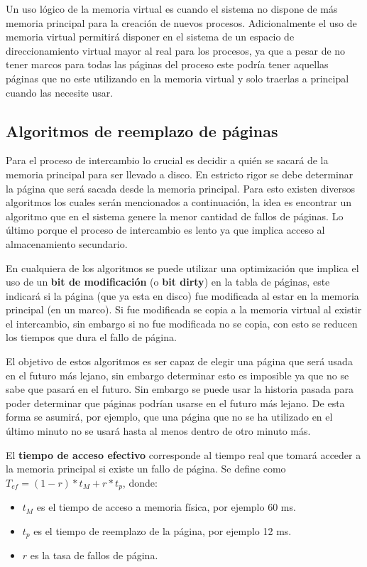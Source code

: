 Un uso lógico de la memoria virtual es cuando el sistema no dispone de más
memoria principal para la creación de nuevos procesos. Adicionalmente el uso de
memoria virtual permitirá disponer en el sistema de un espacio de
direccionamiento virtual mayor al real para los procesos, ya que a pesar de no
tener marcos para todas las páginas del proceso este podría tener aquellas
páginas que no este utilizando en la memoria virtual y solo traerlas a principal
cuando las necesite usar.

\subsection{Algoritmos de reemplazo de páginas}
Para el proceso de intercambio lo crucial es decidir a quién se sacará de la
memoria principal para ser llevado a disco. En estricto rigor se debe determinar
la página que será sacada desde la memoria principal. Para esto existen diversos
algoritmos los cuales serán mencionados a continuación, la idea es encontrar un
algoritmo que en el sistema genere la menor cantidad de fallos de páginas. Lo
último porque el proceso de intercambio es lento ya que implica acceso al
almacenamiento secundario.

En cualquiera de los algoritmos se puede utilizar una optimización que implica
el uso de un \textbf{bit de modificación} (o \textbf{bit dirty}) en la tabla de páginas, este indicará
si la página (que ya esta en disco) fue modificada al estar en la memoria
principal (en un marco). Si fue modificada se copia a la memoria virtual al
existir el intercambio, sin embargo si no fue modificada no se copia, con esto
se reducen los tiempos que dura el fallo de página.

El objetivo de estos algoritmos es ser capaz de elegir una página que será usada
en el futuro más lejano, sin embargo determinar esto es imposible ya que no se
sabe que pasará en el futuro. Sin embargo se puede usar la historia pasada para
poder determinar que páginas podrían usarse en el futuro más lejano. De esta
forma se asumirá, por ejemplo, que una página que no se ha utilizado en el
último minuto no se usará hasta al menos dentro de otro minuto más.

El \textbf{tiempo de acceso efectivo} corresponde al tiempo real que tomará
acceder a la memoria principal si existe un fallo de página. Se define como
$T_{ef} = (1-r) * t_M+r*t_p$, donde:

\begin{itemize}
	\item $t_M$ es el tiempo de acceso a memoria física, por ejemplo 60 ms.
	\item $t_p$ es el tiempo de reemplazo de la página, por ejemplo 12 ms.
	\item $r$ es la tasa de fallos de página.
\end{itemize}

